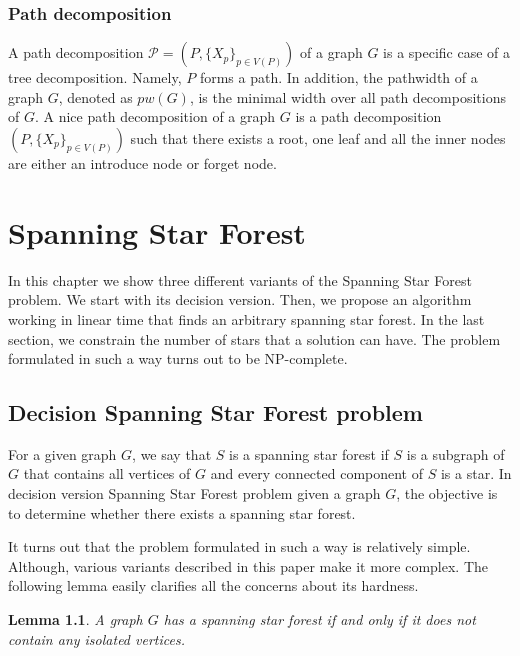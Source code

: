 \documentclass[en]{pracamgr}
\newtheorem{lemma}{Lemma}
\newcommand{\ssf}{spanning star forest}
\newcommand{\ssfp}{{\sc Spanning Star Forest} problem}
\begin{document}
\subsection{Path decomposition}

A path decomposition $\mathcal{P}=(P,\{X_p\}_{p \in V(P)})$ of a graph $G$ is a specific case of a tree decomposition. Namely, $P$ forms a path. In addition, the pathwidth of a graph $G$, denoted as $pw(G)$, is the minimal width over all path decompositions of $G$. A nice path decomposition of a graph $G$ is a path decomposition $(P,\{X_p\}_{p \in V(P)})$ such that there exists a root, one leaf and all the inner nodes are either an introduce node or forget node.

\chapter{Spanning Star Forest}\label{r:losers}

In this chapter we show three different variants of the \ssfp{}. We start with its decision version. Then, we propose an algorithm working in linear time that finds an arbitrary \ssf{}. In the last section, we constrain the number of stars that a solution can have. The problem formulated in such a way turns out to be NP-complete.

\section{Decision Spanning Star Forest problem}

For a given graph $G$, we say that $S$ is a \ssf{} if $S$ is a subgraph of $G$ that contains all vertices of $G$ and every connected component of $S$ is a star. In decision version \ssfp{} given a graph $G$, the objective is to determine whether there exists a \ssf{}.

It turns out that the problem formulated in such a way is relatively simple. Although, various variants described in this paper make it more complex. The following lemma easily clarifies all the concerns about its hardness.

\begin{lemma}\label{SSF lemma}
 A graph $G$ has a \ssf{} if and only if it does not contain any isolated vertices.
\end{lemma}
\end{document}
